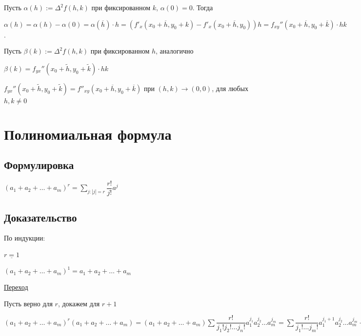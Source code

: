 \documentclass{article}
\begin{document}
            Пусть $\alpha(h) := \Delta^2 f(h, k)$ при фиксированном $k$, $\alpha(0) = 0$. Тогда
            
            $\alpha(h) = \alpha(h) - \alpha(0) = \alpha(\overline{h}) \cdot h = (f'_x(x_0 + \overline{h}, y_0 + k) - f'_x (x_0 + \overline{h}, y_0))h = f_{xy}''(x_0 + \overline{h}, y_0 + \overline{k}) \cdot hk$.
            
            Пусть $\beta(k) := \Delta^2 f(h, k)$ при фиксированном $h$, аналогично
            
            $\beta(k) = f_{yx}''(x_0 + \widetilde{h}, y_0 + \widetilde{k}) \cdot hk$
            
            $f_{yx}''(x_0 + \widetilde{h}, y_0 + \widetilde{k}) = f''_{xy} (x_0 + \overline{h}, y_0 + \overline{k})$ при $(h, k) \rightarrow (0, 0)$, для любых $h, k \neq 0$
            
    \newpage
    
    \section{Полиномиальная формула}
    
        \subsection{Формулировка}
        
            $(a_1 + a_2 + \ldots + a_m)^r = \sum\limits_{j : |j| = r} \dfrac{r!}{j!} a^j$
            
        \subsection{Доказательство}
        
            По индукции:
            
            $\underline{r = 1}$
            
            $(a_1 + a_2 + \ldots + a_m)^1 = a_1 + a_2 + \ldots + a_m$
            
            \underline{Переход}
            
            Пусть верно для $r$, докажем для $r + 1$
            
            $(a_1 + a_2 + \ldots + a_m)^r (a_1 + a_2 + \ldots + a_m) = (a_1 + a_2 + \ldots + a_m) \sum \dfrac{r!}{j_1! j_2! \ldots j_n!} a_1^{j_1} a_2^{j_2} \ldots a_m^{j_m} = \sum \dfrac{r!}{j_1! \ldots j_m!} a_1^{j_1 + 1} a_2^{j_2} \ldots a_m^{j_m} + \sum \dfrac{r!}{j_1! \ldots j_m!} a_1^{j_1} a_2^{j_2 + 1} \ldots a_m^{j_m} + \ldots + \sum \dfrac{r!}{j_1! \ldots j_m!} a_1^{j_1} \ldots a_m^{j_m + 1} =$ 
            
\end{document}
